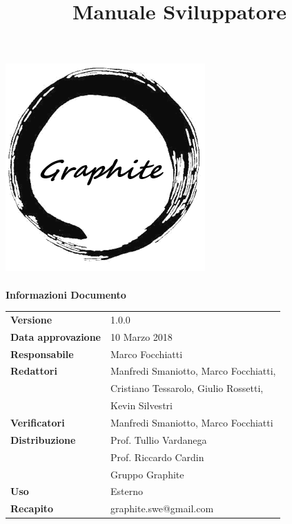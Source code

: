 \documentclass[openany,12pt,a4paper]{report}
\title{Manuale Sviluppatore}
\author{}
\newcommand{\versione}{1.0.0}
\begin{document}
	
	\makeatletter
	\begin{titlepage}
		\setlength{\headsep}{0pt}  
		\begin{center}
			\includegraphics[width=0.5\linewidth]{img/logo.png}\\[1em]
			{\huge \bfseries  \@title }\\[10ex]
			\textbf{\Large Informazioni Documento} \\[2em]
			\bgroup
			\def\arraystretch{1.5}
			\begin{tabular}{l|l}
				\textbf{Versione} & \versione{} \\
				\textbf{Data approvazione} & 10 Marzo 2018 \\
				\textbf{Responsabile} & Marco Focchiatti\\
				\textbf{Redattori} &  Manfredi Smaniotto, Marco Focchiatti,\\
				& Cristiano Tessarolo, Giulio Rossetti, \\
				& Kevin Silvestri \\
				\textbf{Verificatori} & Manfredi Smaniotto, Marco Focchiatti \\
				\textbf{Distribuzione} & Prof. Tullio Vardanega \\
				& Prof. Riccardo Cardin \\
				& Gruppo Graphite \\
				\textbf{Uso} & Esterno \\
				\textbf{Recapito} & graphite.swe@gmail.com \\
			\end{tabular}
			\egroup
		\end{center}
	\end{titlepage}
	\makeatother
	
	\thispagestyle{empty}
	\newpage
	
	
\end{document}
